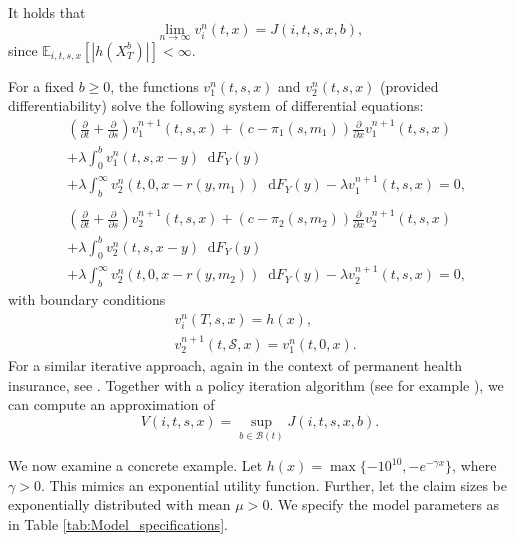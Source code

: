 \documentclass[a4paper]{scrartcl}
\theoremstyle{remark}
\theoremstyle{definition}
\numberwithin{equation}{section}
\newcommand*\diff{\mathop{}\!\mathrm{d}}
\begin{document}
It holds that
\begin{equation*}
    \lim _ {n \to \infty} v_i^n(t,x) =J(i,t,s,x,b),
\end{equation*} since $\mathbb{E}_{i,t,s,x}[|h(X_T^b)|]<\infty$. 

\newpage
For a fixed $b\geq 0$, the functions $v_1^n(t,s,x)$ and $v_2^n(t,s,x)$ (provided differentiability) solve the following system of differential equations:
\begin{align*}
      &\left(\frac{\partial}{\partial t}+\frac{\partial}{\partial s}\right) v_1^{n+1}(t,s,x)+\left(c-\pi_1(s,m_1)\right)\frac{\partial}{\partial x}v_1^{n+1}(t,s,x) \nonumber \\
    &+ \lambda \int_{0}^{b}v_1^n(t,s,x-y)\diff F_Y(y) \nonumber \\
    &+ \lambda \int_{b}^{\infty}v_2^n(t,0,x-r(y,m_1))\diff F_Y(y) - \lambda v_1^{n+1}(t,s,x)=0,\\ \ \\
    &\left(\frac{\partial}{\partial t}+\frac{\partial}{\partial s}\right) v_2^{n+1}(t,s,x)+\left(c-\pi_2(s,m_2)\right)\frac{\partial}{\partial x}v_2^{n+1}(t,s,x) \nonumber \\
     &+ \lambda \int_{0}^{b}v_2^{n}(t,s,x-y)\diff F_Y(y)  \nonumber \\
     &+ \lambda \int_{b}^{\infty}v_2^n(t,0,x-r(y,m_2))\diff F_Y(y)- \lambda v_2^{n+1}(t,s,x)=0,
\end{align*}
with boundary conditions 
\begin{align*}
    &v_i^n(T,s,x)=h(x),\\
        &v_2^{n+1}(t,\mathcal{S},x)=v_1^n(t,0,x).
\end{align*}
For a similar iterative approach, again in the context of permanent health insurance, see \citep{Rolski}.
Together with a policy iteration algorithm (see for example \citep{KushnerDupuis}), we can compute an approximation of 
\begin{equation*}
    V(i,t,s,x)=\sup_{b \in \mathcal{B}(t)}J(i,t,s,x,b).
\end{equation*}


We now examine a concrete example. Let $h(x)=\max\{-10^{10},-e^{-\gamma x}\}$, where $\gamma>0$. This mimics an exponential utility function. Further, let the claim sizes be exponentially distributed with mean $\mu>0$. We specify the model parameters as in Table \ref{tab:Model_specifications}.
\end{document}
